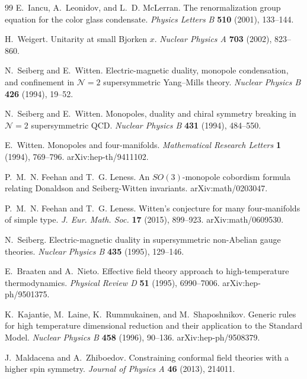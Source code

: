 \begin{thebibliography}{99}
E.~Iancu, A.~Leonidov, and L.~D. McLerran.
The renormalization group equation for the color glass condensate.
\emph{Physics Letters B} \textbf{510} (2001), 133--144.

H.~Weigert.
Unitarity at small Bjorken \(x\).
\emph{Nuclear Physics A} \textbf{703} (2002), 823--860.

N.~Seiberg and E.~Witten.
Electric-magnetic duality, monopole condensation, and confinement in
\(\mathcal N=2\) supersymmetric Yang--Mills theory.
\emph{Nuclear Physics B} \textbf{426} (1994), 19--52.

N.~Seiberg and E.~Witten.
Monopoles, duality and chiral symmetry breaking in
\(\mathcal N=2\) supersymmetric QCD.
\emph{Nuclear Physics B} \textbf{431} (1994), 484--550.

E.~Witten.
Monopoles and four-manifolds.
\emph{Mathematical Research Letters} \textbf{1} (1994), 769--796.
arXiv:hep-th/9411102.

P.~M.~N. Feehan and T.~G. Leness.
An \(SO(3)\)-monopole cobordism formula relating Donaldson and
Seiberg-Witten invariants.
arXiv:math/0203047.

{\raggedright
P.~M.~N. Feehan and T.~G. Leness.
Witten's conjecture for many four-manifolds of simple type.
\emph{J. Eur. Math. Soc.} \textbf{17} (2015), 899--923.
arXiv:math/0609530.
\par}

N.~Seiberg.
Electric-magnetic duality in supersymmetric non-Abelian gauge theories.
\emph{Nuclear Physics B} \textbf{435} (1995), 129--146.

E.~Braaten and A.~Nieto.
Effective field theory approach to high-temperature thermodynamics.
\emph{Physical Review D} \textbf{51} (1995), 6990--7006.
arXiv:hep-ph/9501375.

K.~Kajantie, M.~Laine, K.~Rummukainen, and M.~Shaposhnikov.
Generic rules for high temperature dimensional reduction and their application
to the Standard Model.
\emph{Nuclear Physics B} \textbf{458} (1996), 90--136.
arXiv:hep-ph/9508379.

J.~Maldacena and A.~Zhiboedov.
Constraining conformal field theories with a higher spin symmetry.
\emph{Journal of Physics A} \textbf{46} (2013), 214011.


\end{thebibliography}
